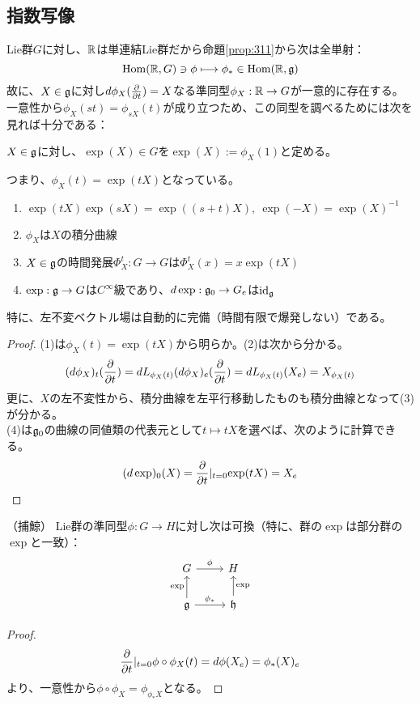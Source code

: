 \subsection{指数写像}
Lie群$G$に対し、$\mathbb{R}$は単連結Lie群だから命題\ref{prop:311}から次は全単射：
\[\mathrm{Hom}(\mathbb{R},G)\ni\phi\longmapsto\phi_*\in\mathrm{Hom}(\mathbb{R},\mathfrak{g})\]
故に、$X\in\mathfrak{g}$に対し$d\phi_X(\frac{\partial }{\partial t})=X$なる準同型$\phi_X:\mathbb{R}\to G$が一意的に存在する。一意性から$\phi_X(st)=\phi_{sX}(t)$が成り立つため、この同型を調べるためには次を見れば十分である：
\begin{defi}[指数写像]
    $X\in\mathfrak{g}$に対し、$\exp(X)\in G$を$\exp(X):=\phi_X(1)$と定める。
\end{defi}
つまり、$\phi_X(t)=\exp(tX)$となっている。
\begin{thm}
    \begin{enumerate}[(1)]
        \item $\exp(tX)\exp(sX)=\exp((s+t)X),\ \exp(-X)=\exp(X)^{-1}$
        \item $\phi_X$は$X$の積分曲線
        \item $X\in\mathfrak{g}$の時間発展$\Phi_X^t:G\to G$は$\Phi_X^t(x)=x\exp(tX)$
        \item $\exp:\mathfrak{g}\to G$は$C^\infty$級であり、$d\exp:\mathfrak{g}_0\to G_e$は$\mathrm{id}_{\mathfrak{g}}$
    \end{enumerate}
\end{thm}
特に、左不変ベクトル場は自動的に完備（時間有限で爆発しない）である。
\begin{proof}
    (1)は$\phi_X(t)=\exp(tX)$から明らか。(2)は次から分かる。
    \[(d\phi_X)_t(\frac{\partial }{\partial t})=dL_{\phi_X(t)}(d\phi_X)_e(\frac{\partial }{\partial t})=dL_{\phi_X(t)}(X_e)=X_{\phi_X(t)}\]
    更に、$X$の左不変性から、積分曲線を左平行移動したものも積分曲線となって(3)が分かる。\\
    (4)は$\mathfrak{g}_0$の曲線の同値類の代表元として$t\mapsto tX$を選べば、次のように計算できる。
    \[(d\exp)_0(X)=\frac{\partial }{\partial t}\lvert_{t=0}\exp(tX)=X_e\]
\end{proof}
\begin{thm}（捕鯨）
    Lie群の準同型$\phi:G\to H$に対し次は可換（特に、群の$\exp$は部分群の$\exp$と一致）：
    \[\begin{tikzcd}
        G\arrow[r,"\phi"] & H\\
        \g\arrow[u,"\exp"]\arrow[r,"\phi_*"] &\h\arrow[u,"\exp"']
    \end{tikzcd}\]
\end{thm}
\begin{proof}
    \[\frac{\partial }{\partial t}\lvert_{t=0}\phi\circ\phi_X(t)=d\phi(X_e)=\phi_*(X)_e\]
    より、一意性から$\phi\circ\phi_X=\phi_{\phi_*X}$となる。
\end{proof}
